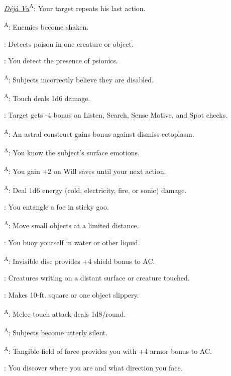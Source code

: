 \noindent\textit{\hyperref[psionic:Deja Vu]{Déjà Vu}}\textsuperscript{A}: Your target repeats his last action.

\textsuperscript{A}: Enemies become shaken.

: Detects poison in one creature or object.

: You detect the presence of psionics.

\textsuperscript{A}: Subjects incorrectly believe they are disabled.

\textsuperscript{A}: Touch deals 1d6 damage.

: Target gets -4 bonus on Listen, Search, Sense Motive, and Spot checks.

\textsuperscript{A}: An astral construct gains bonus against dismiss ectoplasm.

\textsuperscript{A}: You know the subject's surface emotions.

\textsuperscript{A}: You gain +2 on Will saves until your next action.

\textsuperscript{A}: Deal 1d6 energy (cold, electricity, fire, or sonic) damage.

: You entangle a foe in sticky goo.

\textsuperscript{A}: Move small objects at a limited distance.

: You buoy yourself in water or other liquid.

\textsuperscript{A}: Invisible disc provides +4 shield bonus to AC.

: Creatures writing on a distant surface or creature touched.

: Makes 10-ft. square or one object slippery.

\textsuperscript{A}: Melee touch attack deals 1d8/round.

\textsuperscript{A}: Subjects become utterly silent.

\textsuperscript{A}: Tangible field of force provides you with +4 armor bonus to AC.

: You discover where you are and what direction you face.

